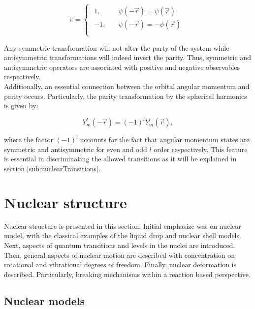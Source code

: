 \documentclass[openany]{book}
\begin{document}
\begin{equation} \label{eq:parity_observables}
	\pi = 	\left\{\begin{array}{l}
		\begin{split}
			1, \quad & \psi(-\vec r) = \psi(\vec r) \\ 
			-1, \quad & \psi(-\vec r) = -\psi(\vec r) \\
		\end{split}
	\end{array}\right.
\end{equation}

Any symmetric transformation will not alter the party of the system while antisymmetric transformations will indeed invert the parity. Thus, symmetric and antisymmetric operators are associated with positive and negative observables respectively.  \\

Additionally, an essential connection between the orbital angular momentum and parity occurs. Particularly, the parity transformation by the spherical harmonics is given by:

\begin{equation} \label{eq:parity_sphericalHarmonics}
	Y^{l}_{m}(-\vec r) = (-1)^{l}Y^{l}_{m}(\vec r),
\end{equation}

where the factor $(-1)^{l}$ accounts for the fact that angular momentum states are symmetric and antisymmetric for even and odd $l$ order respectively. This feature is essential in discriminating the allowed transitions as it will be explained in section \ref{sub:nuclearTransitions}. 


\section{Nuclear structure} \label{sec:nuclearStructure}

Nuclear structure is presented in this section. Initial emphasize was  on nuclear model, with the classical examples of the liquid drop and nuclear shell models. Next, aspects of quantum transitions and levels in the nuclei are introduced. Then, general aspects of nuclear motion are described with concentration on rotational and vibrational degrees of freedom. Finally, nuclear deformation is described. Particularly, breaking mechanisms within a reaction based perspective. 

\subsection{Nuclear models}  \label{sub:nuclearModels}
\end{document}
